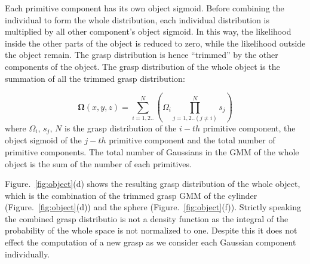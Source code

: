Each primitive component has its own object sigmoid. Before combining the individual to form the whole distribution, each individual distribution is multiplied by all other component's object sigmoid. In this way, the likelihood inside the other parts of the object is reduced to zero, while the likelihood outside the object remain. The grasp distribution is hence ``trimmed'' by the other components of the object. The grasp distribution of the whole object is the summation of all the trimmed grasp distribution:

\begin{equation}
\boldsymbol{\Omega}\left(x,y,z\right) = \sum_{i=1,2..}^{N}\left(\Omega_i\prod_{j=1,2..\left(j\neq{i}\right)}^{N}s_j\right)
\end{equation}
where $\Omega_i$, $s_j$, $N$ is the grasp distribution of the $i-th$ primitive component, the object sigmoid of the $j-th$ primitive component and the total number of primitive components. The total number of Gaussians in the GMM of the whole object is the sum of the number of each primitives.

Figure.~\ref{fig:object}(d) shows the resulting grasp distribution of the whole object, which is the combination of the trimmed grasp GMM of the cylinder (Figure.~\ref{fig:object}(d)) and the sphere (Figure.~\ref{fig:object}(f)). Strictly speaking the combined grasp distributio is not a density function as the integral of the probability of the whole space is not normalized to one. Despite this it does not effect the computation of a new grasp as we consider each Gaussian component individually.

